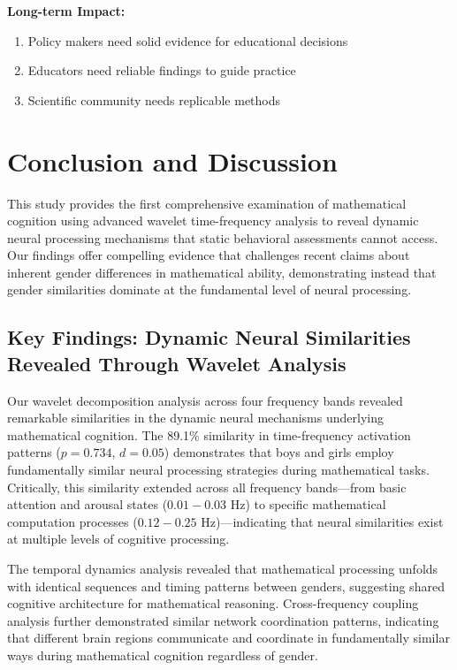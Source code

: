 \documentclass[pdflatex,sn-nature]{sn-jnl}%
\theoremstyle{thmstyleone}%
\theoremstyle{thmstyletwo}%
\theoremstyle{thmstylethree}%
\begin{document}
\medskip\noindent
\textbf{Long-term Impact:}
\begin{enumerate}
\item Policy makers need solid evidence for educational decisions
\item Educators need reliable findings to guide practice
\item Scientific community needs replicable methods
\end{enumerate}


\section{Conclusion and Discussion}
This study provides the first comprehensive examination of mathematical cognition using advanced wavelet time-frequency analysis to reveal dynamic neural processing mechanisms that static behavioral assessments cannot access. Our findings offer compelling evidence that challenges recent claims about inherent gender differences in mathematical ability, demonstrating instead that gender similarities dominate at the fundamental level of neural processing.


\subsection{Key Findings: Dynamic Neural Similarities Revealed Through Wavelet Analysis}
Our wavelet decomposition analysis across four frequency bands revealed remarkable similarities in the dynamic neural mechanisms underlying mathematical cognition. The 89.1\% similarity in time-frequency activation patterns ($p = 0.734$, $d = 0.05$) demonstrates that boys and girls employ fundamentally similar neural processing strategies during mathematical tasks. Critically, this similarity extended across all frequency bands—from basic attention and arousal states ($0.01-0.03$ Hz) to specific mathematical computation processes ($0.12-0.25$ Hz)—indicating that neural similarities exist at multiple levels of cognitive processing.

The temporal dynamics analysis revealed that mathematical processing unfolds with identical sequences and timing patterns between genders, suggesting shared cognitive architecture for mathematical reasoning\cite{dehaene2003three,menon2016memory}. Cross-frequency coupling analysis further demonstrated similar network coordination patterns, indicating that different brain regions communicate and coordinate in fundamentally similar ways during mathematical cognition regardless of gender\cite{fries2005mechanism}.
\end{document}
